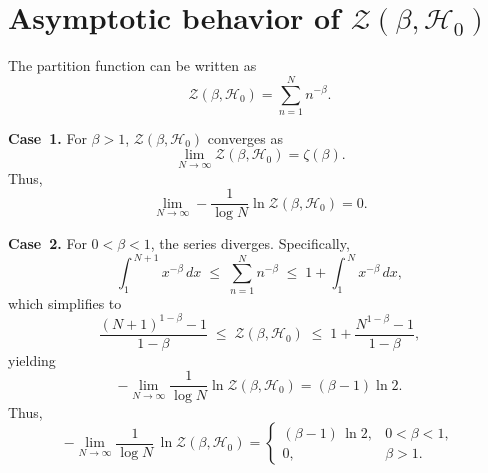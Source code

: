 \documentclass[aps,pra,twocolumn,superscriptaddress,preprintnumbers,amsmath,amssymb]{revtex4-2}
\begin{document}
\section{Asymptotic behavior of $\mathcal{Z}(\beta,\mathcal{H}_0)$}
The partition function can be written as
\begin{equation}
    \mathcal{Z}(\beta,\mathcal{H}_0) = \sum_{n=1}^{N} n^{-\beta}.
\end{equation}\par
\textbf{Case~1.} For $\beta>1$, $\mathcal{Z}(\beta,\mathcal{H}_0)$ converges as
\begin{equation}
    \lim_{N \to \infty}
    \mathcal{Z}(\beta,\mathcal{H}_0)
    = \zeta(\beta).
\end{equation}
Thus,
\begin{equation}
    \lim_{N \to \infty}
    -\frac{1}{\log N}\ln \mathcal{Z}(\beta,\mathcal{H}_0)  = 0.
\end{equation}\par
\textbf{Case~2.} For $0 < \beta < 1$, the series diverges. Specifically,
\begin{equation}\label{eq:integral-bounds}
\int_{1}^{\,N+1} x^{-\beta}\,dx \;\le\; \sum_{n=1}^{N} n^{-\beta} \;\le\; 1+\int_{1}^{\,N} x^{-\beta}\,dx,
\end{equation}
which simplifies to
\begin{equation}\label{eq:asymp-sum}
\frac{(N+1)^{1-\beta}-1}{1-\beta}\;\le\;\mathcal Z(\beta,\mathcal{H}_0)\;\le\;1+\frac{N^{1-\beta}-1}{1-\beta},
\end{equation}
 yielding
\begin{equation}
    -\lim_{N\rightarrow\infty}\frac{1}{\log N}\ln\mathcal Z(\beta,\mathcal{H}_0)=(\beta-1)\ln2.
\end{equation}
Thus,
\begin{equation}
-\lim_{N\to\infty}\frac{1}{\log N}\,\ln \mathcal{Z}(\beta,\mathcal{H}_0)
=\begin{cases}
(\beta-1)\,\ln 2, & 0<\beta<1,\\[2pt]
0, & \beta> 1.
\end{cases}
\end{equation}
\end{document}
